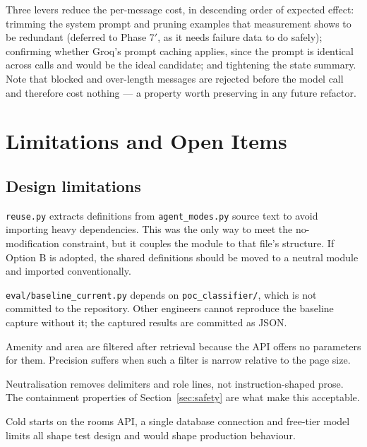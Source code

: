 \documentclass[11pt,a4paper]{article}
\newcommand{\fn}[1]{\texttt{\small #1}}
\begin{document}
Three levers reduce the per-message cost, in descending order of expected effect: trimming the
system prompt and pruning examples that measurement shows to be redundant (deferred to Phase
7$'$, as it needs failure data to do safely); confirming whether Groq's prompt caching applies,
since the prompt is identical across calls and would be the ideal candidate; and tightening
the state summary. Note that blocked and over-length messages are rejected before the model
call and therefore cost nothing --- a property worth preserving in any future refactor.

\section{Limitations and Open Items}

\subsection{Design limitations}

\begin{description}[leftmargin=1.4em,style=nextline,itemsep=3pt]
\item[The source-extraction bridge.] \fn{reuse.py} extracts definitions from
\fn{agent\_modes.py} source text to avoid importing heavy dependencies. This was the only way
to meet the no-modification constraint, but it couples the module to that file's structure. If
Option B is adopted, the shared definitions should be moved to a neutral module and imported
conventionally.

\item[Baseline reproducibility.] \fn{eval/baseline\_current.py} depends on
\fn{poc\_classifier/}, which is not committed to the repository. Other engineers cannot
reproduce the baseline capture without it; the captured results are committed as JSON.

\item[Client-side filtering.] Amenity and area are filtered after retrieval because the API
offers no parameters for them. Precision suffers when such a filter is narrow relative to the
page size.

\item[Instruction-like prose in room text.] Neutralisation removes delimiters and role lines,
not instruction-shaped prose. The containment properties of Section~\ref{sec:safety} are what make this
acceptable.

\item[Infrastructure constraints.] Cold starts on the rooms API, a single database connection
and free-tier model limits all shape test design and would shape production behaviour.
\end{description}
\end{document}
